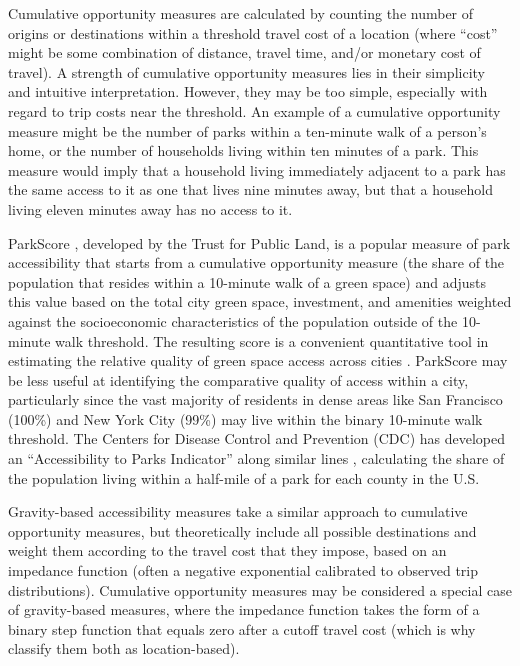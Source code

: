 \documentclass[3p, authoryear, review, doubleblind]{elsarticle} %
\begin{document}
Cumulative opportunity measures are calculated by counting the number of origins
or destinations within a threshold travel cost of a location (where ``cost'' might
be some combination of distance, travel time, and/or monetary cost of travel). A
strength of cumulative opportunity measures lies in their simplicity and
intuitive interpretation. However, they may be too simple, especially with
regard to trip costs near the threshold. An example of a cumulative opportunity
measure might be the number of parks within a ten-minute walk of a person's
home, or the number of households living within ten minutes of a park. This
measure would imply that a household living immediately adjacent to a park has
the same access to it as one that lives nine minutes away, but that a household
living eleven minutes away has no access to it.

ParkScore \citep{parkscore2019}, developed by the Trust for Public Land, is a popular
measure of park accessibility that starts from a cumulative opportunity measure
(the share of the population that resides within a 10-minute walk of a green
space) and adjusts this value based on the total city green space, investment,
and amenities weighted against the socioeconomic characteristics of the
population outside of the 10-minute walk threshold. The resulting score is a
convenient quantitative tool in estimating the relative quality of green space
access across cities \citep{Rigolon2018}. ParkScore may be less useful at identifying
the comparative quality of access within a city, particularly since the vast
majority of residents in dense areas like San Francisco (100\%) and New York City
(99\%) may live within the binary 10-minute walk threshold. The Centers for
Disease Control and Prevention (CDC) has developed an ``Accessibility to Parks
Indicator'' along similar lines \citep{Ussery2016}, calculating the share of the
population living within a half-mile of a park for each county in the U.S.

Gravity-based accessibility measures take a similar approach to cumulative
opportunity measures, but theoretically include all possible destinations and
weight them according to the travel cost that they impose, based on an impedance
function (often a negative exponential calibrated to observed trip
distributions). Cumulative opportunity measures may be considered a special case
of gravity-based measures, where the impedance function takes the form of a
binary step function that equals zero after a cutoff travel cost (which is why
\citet{GEURS2004127} classify them both as location-based).
\end{document}

